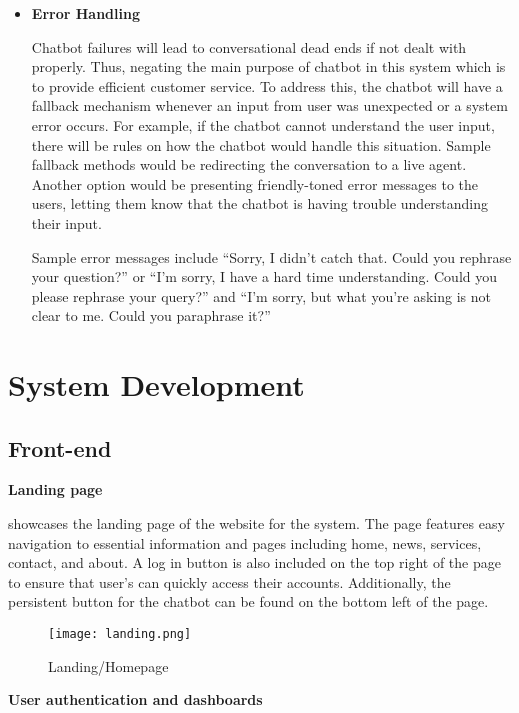 \begin{itemize}
	\item \textbf{Error Handling}
	
	Chatbot failures will lead to conversational dead ends if not dealt with properly. Thus, negating the main purpose of chatbot in this system which is to provide efficient customer service. To address this, the chatbot will have a fallback mechanism whenever an input from user was unexpected or a system error occurs. For example, if the chatbot cannot understand the user input, there will be rules on how the chatbot would handle this situation. Sample fallback methods would be redirecting the conversation to a live agent. Another option would be presenting friendly-toned error messages to the users, letting them know that the chatbot is having trouble understanding their input.
	 
	\subitem Sample error messages include “Sorry, I didn't catch that. Could you rephrase your question?” or “I'm sorry, I have a hard time understanding. Could you please rephrase your query?” and “I'm sorry, but what you're asking is not clear to me. Could you paraphrase it?”
	
\end{itemize}


\section{System Development}

\subsection{Front-end}

\noindent\textbf{Landing page}

\noindent {} showcases the landing page of the website for the system. The page features easy navigation to essential information and pages including home, news, services, contact, and about. A log in button is also included on the top right of the page to ensure that user's can quickly access their accounts. Additionally, the persistent button for the chatbot can be found on the bottom left of the page.

\begin{figure}[h]
	\centering 
	\texttt{[image: landing.png]}
	\caption{Landing/Homepage}
	\label{fig:landing}
\end{figure}

\newpage

\noindent \textbf{User authentication and dashboards}

